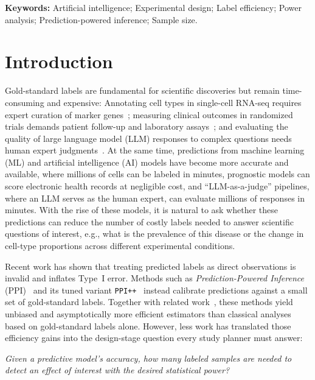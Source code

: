 \documentclass[12pt]{article}
\title{\papertitle}
\author{\PPIAuthorBlockArxiv}
\date{}
\newcommand{\papersummary}{Modern studies increasingly leverage outcomes predicted by machine learning and artificial intelligence (AI/ML) models, and recent work, such as prediction-powered inference (PPI), has developed valid downstream statistical inference procedures. However, classical power and sample size formulas do not readily account for these predictions. In this work, we tackle a simple yet practical question: given a new AI/ML model with high predictive power, how many labeled samples are needed to achieve a desired level of statistical power? We derive closed-form power formulas by characterizing the asymptotic variance of the PPI estimator and applying Wald test inversion to obtain the required labeled sample size. Our results cover widely used settings including two-sample comparisons and risk measures in $2\times2$ tables. We find that a useful rule of thumb is that the reduction in required labeled samples relative to classical designs scales roughly with the $R^2$ between the predictions and the ground truth. Our analytical formulas are validated using Monte Carlo simulations, and we illustrate the framework in three contemporary biomedical applications spanning single-cell transcriptomics, clinical blood pressure measurement, and dermoscopy imaging. We provide our software as an \texttt{R} package and online calculators at \url{https://github.com/yiqunchen/pppower}.}
\newcommand{\paperkeywords}{Artificial intelligence; Experimental design; Label efficiency; Power analysis; Prediction-powered inference; Sample size.}
\begin{document}
\maketitle
\begin{abstract}
\sloppy
\noindent\papersummary
\end{abstract}
\fussy
\noindent\textbf{Keywords:} \paperkeywords
\vspace{1em}
\section{Introduction}
\label{sec:intro}

Gold-standard labels are fundamental for scientific discoveries but remain time-consuming and expensive: Annotating cell types in single-cell RNA-seq requires expert curation of marker
genes~\citep{baron2016single}; measuring clinical outcomes in randomized trials demands patient follow-up and laboratory assays~\citep{rodger2012diagnostic}; and evaluating the quality of large language model (LLM) responses to complex questions needs human expert judgments~\citep{chiang2024chatbot}. At the same time, predictions from machine learning (ML) and artificial intelligence (AI) models have become more accurate and available, where millions of cells can be labeled in minutes, prognostic models can score electronic health records at negligible cost, and ``LLM-as-a-judge'' pipelines, where an LLM serves as the human expert, can evaluate millions of responses
in minutes. With the rise of these models, it is natural to ask whether these predictions can reduce the number of costly labels needed to answer scientific questions of interest, e.g., what is the prevalence of this disease or the change in cell-type proportions across different experimental conditions. 

Recent work has shown that treating predicted labels as direct observations is invalid and inflates Type~I error. Methods such as \emph{Prediction-Powered Inference}
(PPI)~\citep{angelopoulos2023prediction} and its tuned variant
\texttt{PPI++}~\citep{angelopoulos2023ppipp} instead calibrate predictions against a small set of gold-standard labels. Together with related work~\citep{zrnic2024cross,miao2025assumption,egami2023using,gronsbell2024another}, these methods yield unbiased and asymptotically more efficient estimators than classical analyses based on gold-standard labels alone. However, less work has translated those efficiency gains into the design-stage question every study planner must answer:
\begin{tcolorbox}
\emph{Given a predictive model's accuracy, how many labeled samples
are needed to detect an effect of interest with the desired
statistical power?}
\end{tcolorbox}
\end{document}
